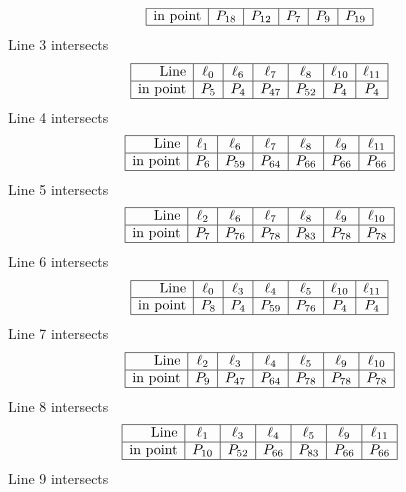 \documentclass{article}
\begin{document}
{$$\begin{array}{|r*{5}{|c}|}
\hline
\mbox{in point}  & P_{18} & P_{12} & P_{7} & P_{9} & P_{19}\\
\hline
\end{array}
$$
Line 3 intersects 
$$
\begin{array}{|r*{6}{|c}|}
\hline
\mbox{Line}  & \ell_{0} & \ell_{6} & \ell_{7} & \ell_{8} & \ell_{10} & \ell_{11}\\
\hline
\mbox{in point}  & P_{5} & P_{4} & P_{47} & P_{52} & P_{4} & P_{4}\\
\hline
\end{array}
$$
Line 4 intersects 
$$
\begin{array}{|r*{6}{|c}|}
\hline
\mbox{Line}  & \ell_{1} & \ell_{6} & \ell_{7} & \ell_{8} & \ell_{9} & \ell_{11}\\
\hline
\mbox{in point}  & P_{6} & P_{59} & P_{64} & P_{66} & P_{66} & P_{66}\\
\hline
\end{array}
$$
Line 5 intersects 
$$
\begin{array}{|r*{6}{|c}|}
\hline
\mbox{Line}  & \ell_{2} & \ell_{6} & \ell_{7} & \ell_{8} & \ell_{9} & \ell_{10}\\
\hline
\mbox{in point}  & P_{7} & P_{76} & P_{78} & P_{83} & P_{78} & P_{78}\\
\hline
\end{array}
$$
Line 6 intersects 
$$
\begin{array}{|r*{6}{|c}|}
\hline
\mbox{Line}  & \ell_{0} & \ell_{3} & \ell_{4} & \ell_{5} & \ell_{10} & \ell_{11}\\
\hline
\mbox{in point}  & P_{8} & P_{4} & P_{59} & P_{76} & P_{4} & P_{4}\\
\hline
\end{array}
$$
Line 7 intersects 
$$
\begin{array}{|r*{6}{|c}|}
\hline
\mbox{Line}  & \ell_{2} & \ell_{3} & \ell_{4} & \ell_{5} & \ell_{9} & \ell_{10}\\
\hline
\mbox{in point}  & P_{9} & P_{47} & P_{64} & P_{78} & P_{78} & P_{78}\\
\hline
\end{array}
$$
Line 8 intersects 
$$
\begin{array}{|r*{6}{|c}|}
\hline
\mbox{Line}  & \ell_{1} & \ell_{3} & \ell_{4} & \ell_{5} & \ell_{9} & \ell_{11}\\
\hline
\mbox{in point}  & P_{10} & P_{52} & P_{66} & P_{83} & P_{66} & P_{66}\\
\hline
\end{array}
$$
Line 9 intersects 
$$
\begin{array}{|r*{7}{|c}|}

\end{array}$$}
\end{document}
